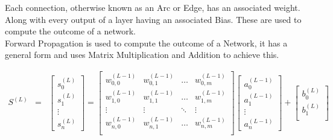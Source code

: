 \begin{flushleft}
                    Each connection, otherwise known as an Arc or Edge, has an associated weight. Along with every output of a
                    layer having an associated Bias. These are used to compute the outcome of a network. \\
                    \vspace{0.2cm}
                    Forward Propagation is used to compute the outcome of a Network, it has a general form and uses 
                    Matrix Multiplication and Addition to achieve this.
                    \vspace{0.2cm}
                    
                    \begin{eqnarray*}
                        S^{(L)} &=& 
                        \begin{bmatrix}
                        s^{(L)}_{0} \\
                        s^{(L)}_{1} \\
                        \vdots      \\
                        s^{(L)}_{n} 
                        \end{bmatrix}
                        = 
                        \begin{bmatrix}
                        w^{(L-1)}_{0,0} & w^{(L-1)}_{0,1} & \hdots  & w^{(L-1)}_{0,m} \\
                        w^{(L-1)}_{1,0} & w^{(L-1)}_{1,1} & \hdots  & w^{(L-1)}_{1,m} \\
                        \vdots          & \vdots          & \ddots  & \vdots          \\
                        w^{(L-1)}_{n,0} & w^{(L-1)}_{n,1} & \hdots  & w^{(L-1)}_{n,m} \\
                        \end{bmatrix}
                        \begin{bmatrix}
                        a^{(L-1)}_{0} \\
                        a^{(L-1)}_{1} \\
                        \vdots      \\
                        a^{(L-1)}_{n} 
                        \end{bmatrix}
                        +
                        \begin{bmatrix}
                        b^{(L)}_{0} \\
                        b^{(L)}_{1} \\

\end{bmatrix}
\end{eqnarray*}
\end{flushleft}
